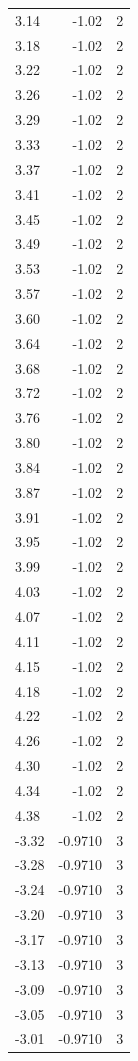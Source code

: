 \begin{longtable}{lrr}
  3.14 & -1.02 & 2 \\
  3.18 & -1.02 & 2 \\
  3.22 & -1.02 & 2 \\
  3.26 & -1.02 & 2 \\
  3.29 & -1.02 & 2 \\
  3.33 & -1.02 & 2 \\
  3.37 & -1.02 & 2 \\
  3.41 & -1.02 & 2 \\
  3.45 & -1.02 & 2 \\
  3.49 & -1.02 & 2 \\
  3.53 & -1.02 & 2 \\
  3.57 & -1.02 & 2 \\
  3.60 & -1.02 & 2 \\
  3.64 & -1.02 & 2 \\
  3.68 & -1.02 & 2 \\
  3.72 & -1.02 & 2 \\
  3.76 & -1.02 & 2 \\
  3.80 & -1.02 & 2 \\
  3.84 & -1.02 & 2 \\
  3.87 & -1.02 & 2 \\
  3.91 & -1.02 & 2 \\
  3.95 & -1.02 & 2 \\
  3.99 & -1.02 & 2 \\
  4.03 & -1.02 & 2 \\
  4.07 & -1.02 & 2 \\
  4.11 & -1.02 & 2 \\
  4.15 & -1.02 & 2 \\
  4.18 & -1.02 & 2 \\
  4.22 & -1.02 & 2 \\
  4.26 & -1.02 & 2 \\
  4.30 & -1.02 & 2 \\
  4.34 & -1.02 & 2 \\
  4.38 & -1.02 & 2 \\
  -3.32 & -0.9710 & 3 \\
  -3.28 & -0.9710 & 3 \\
  -3.24 & -0.9710 & 3 \\
  -3.20 & -0.9710 & 3 \\
  -3.17 & -0.9710 & 3 \\
  -3.13 & -0.9710 & 3 \\
  -3.09 & -0.9710 & 3 \\
  -3.05 & -0.9710 & 3 \\
  -3.01 & -0.9710 & 3 \\

\end{longtable}

